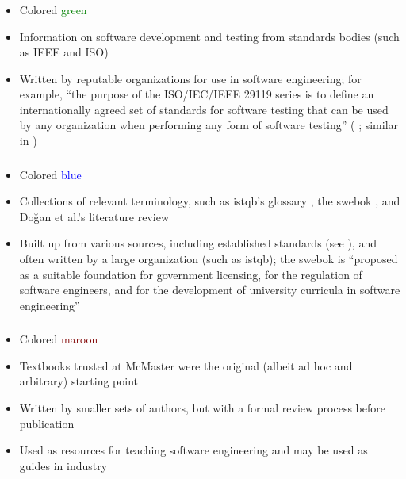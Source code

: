 \subsubsection{}
\label{stds}
\begin{itemize}
    \item Colored \textcolor{green}{green}
    \item Information on software development and testing from
          standards bodies \ifnotpaper\else (such as IEEE and ISO)\fi
    \item Written by reputable organizations for use in software engineering;
          for example, ``the purpose of the ISO/IEC/IEEE 29119 series is to
          define an internationally agreed set of standards for software
          testing that can be used by any organization when performing any form
          of software testing'' \ifnotpaper(\fi\citealp[p.~vii]{IEEE2022}%
          \ifnotpaper; similar in \citeyear[p.~ix]{IEEE2016})\fi
\end{itemize}

\subsubsection{}
\label{metas}
\begin{itemize}
    \item Colored \textcolor{blue}{blue}
    \item Collections of relevant terminology, such as \acs{istqb}'s glossary
          \citepISTQB{}, the \acs{swebok} \citep{SWEBOK2024,SWEBOK2014}, and
          \ifnotpaper \citeauthor{DoğanEtAl2014}\else Doğan et al.\fi's
          literature review \citeyearpar{DoğanEtAl2014}
    \item Built up from various sources, including established standards
          (see ), and often written
          by a large organization (such as \acs{istqb}); the \acs{swebok} is
          ``proposed as a suitable foundation for government licensing, for the
          regulation of software engineers, and for the development of
          university curricula in software engineering''
          \citep[p.~xix]{KanerEtAl2011}
\end{itemize}

\subsubsection{}
\label{texts}
\begin{itemize}
    \item Colored \textcolor{Maroon}{maroon}
    \item Textbooks trusted at McMaster \citep{Patton2006, PetersAndPedrycz2000,
              vanVliet2000} were the original (albeit ad hoc and arbitrary)
          starting point
    \item Written by smaller sets of authors, but with a formal review process
          before publication
    \item Used as resources for teaching software engineering and may be used
          as guides in industry
\end{itemize}

